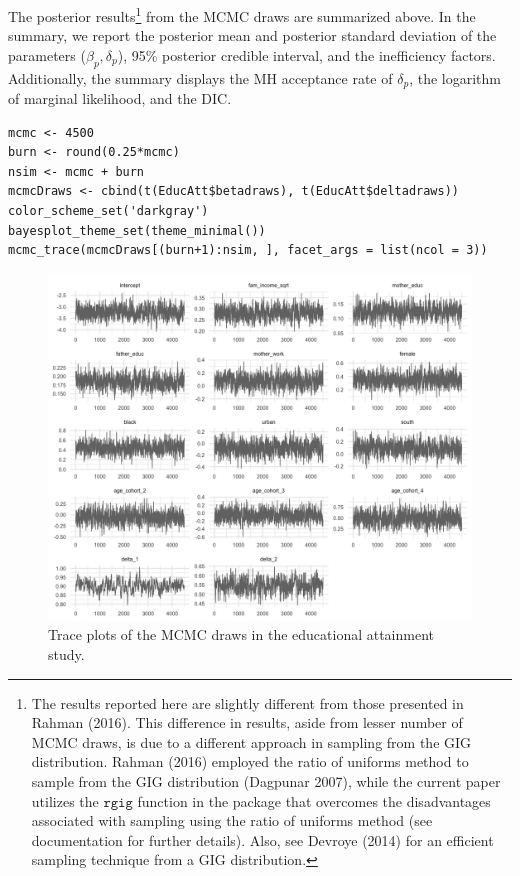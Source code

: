 The posterior results\footnote{The results reported here are slightly different from those presented in Rahman (2016). This difference in results, aside from lesser number of MCMC draws, is due to a different approach in sampling from the GIG distribution. Rahman (2016) employed the ratio of uniforms method to sample from the GIG distribution (Dagpunar 2007), while the current paper utilizes the \(\texttt{rgig}\) function in the  package that overcomes the disadvantages associated with sampling using the ratio of uniforms method (see  documentation for further details). Also, see Devroye (2014) for an efficient sampling technique from a GIG distribution.} from the MCMC draws are summarized above. In the summary, we report the posterior mean and posterior standard deviation of the parameters (\(\beta_{p}, \delta_{p}\)), 95\% posterior credible interval, and the inefficiency factors. Additionally, the summary displays the MH acceptance rate of \(\delta_{p}\), the logarithm of marginal likelihood, and the DIC.

\begin{verbatim}
mcmc <- 4500
burn <- round(0.25*mcmc)
nsim <- mcmc + burn
mcmcDraws <- cbind(t(EducAtt$betadraws), t(EducAtt$deltadraws))
color_scheme_set('darkgray')
bayesplot_theme_set(theme_minimal())
mcmc_trace(mcmcDraws[(burn+1):nsim, ], facet_args = list(ncol = 3))
\end{verbatim}

\begin{figure}

{\centering \includegraphics[width=1\linewidth,height=0.5\textheight]{EducTracePlot} 

}

\caption{Trace plots of the MCMC draws in the educational attainment study.}\label{fig:EducTracePlot-tab-static}
\end{figure}

